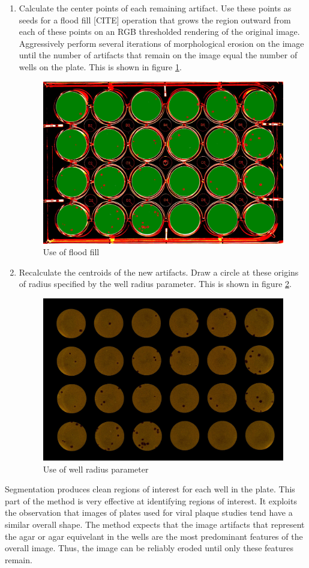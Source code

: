 \documentclass[11pt,final,twocolumn]{IEEEtran}
\begin{document}
\begin{enumerate}
\item
Calculate the center points of each remaining artifact. Use these points as seeds for a flood fill [CITE] operation that grows the region outward from each of these points on an RGB thresholded rendering of the original image.
Aggressively perform several iterations of morphological erosion on the image until the number of artifacts that remain on the image equal the number of wells on the plate. This is shown in figure \ref{fig:segFloodFill}.
\begin{figure}[H]
\centering
\includegraphics[width=.4\textwidth]{segmentFloodFill.jpg}
\caption{Use of flood fill}
\label{fig:segFloodFill}
\end{figure}

\item
Recalculate the centroids of the new artifacts. Draw a circle at these origins of radius specified by the well radius parameter. This is shown in figure \ref{fig:segUseRadius}.
\begin{figure}[H]
\centering
\includegraphics[width=.4\textwidth]{segmentUseRadius.jpg}
\caption{Use of well radius parameter}
\label{fig:segUseRadius}
\end{figure}

\end{enumerate}

Segmentation produces clean regions of interest for each well in the plate. This part of the method is very effective at identifying regions of interest. It exploits the observation that images of plates used for viral plaque studies tend have a similar overall shape. The method expects that the image artifacts that represent the agar or agar equivelant in the wells are the most predominant features of the overall image.    Thus, the image can be reliably eroded until only these features remain.  
\end{document}
